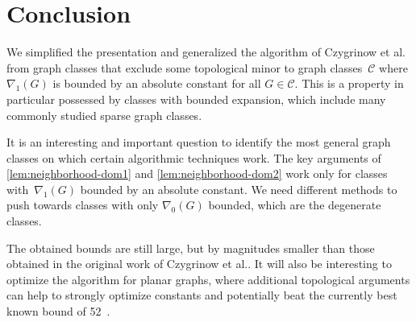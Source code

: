 \section{Conclusion}

We simplified the presentation and generalized the algorithm of Czygrinow et al.~\cite{czygrinow2018distributed} from graph classes that exclude
some topological minor to graph classes~$\mathcal{C}$ where
$\nabla_1(G)$ is bounded
by an absolute constant for all $G\in \mathcal{C}$. This is a property
in particular possessed by classes with bounded expansion, which include
many commonly studied sparse graph classes.

It is an interesting and important question to identify the most
general graph classes on which certain algorithmic techniques work.
The key arguments of \cref{lem:neighborhood-dom1} and \cref{lem:neighborhood-dom2} work only for classes with~$\nabla_1(G)$ bounded by an absolute constant. We need different methods
to push towards classes with only $\nabla_0(G)$ bounded,
which are the degenerate classes.

The obtained bounds are still large,
but by magnitudes smaller than those obtained in the original work of
Czygrinow et al.\cite{czygrinow2018distributed}. It will also be
interesting to optimize the algorithm for planar graphs, where additional
topological arguments can help to strongly optimize constants and
potentially beat the currently best known bound of 52~\cite{lenzen2013distributed,wawrzyniak2014strengthened}.
